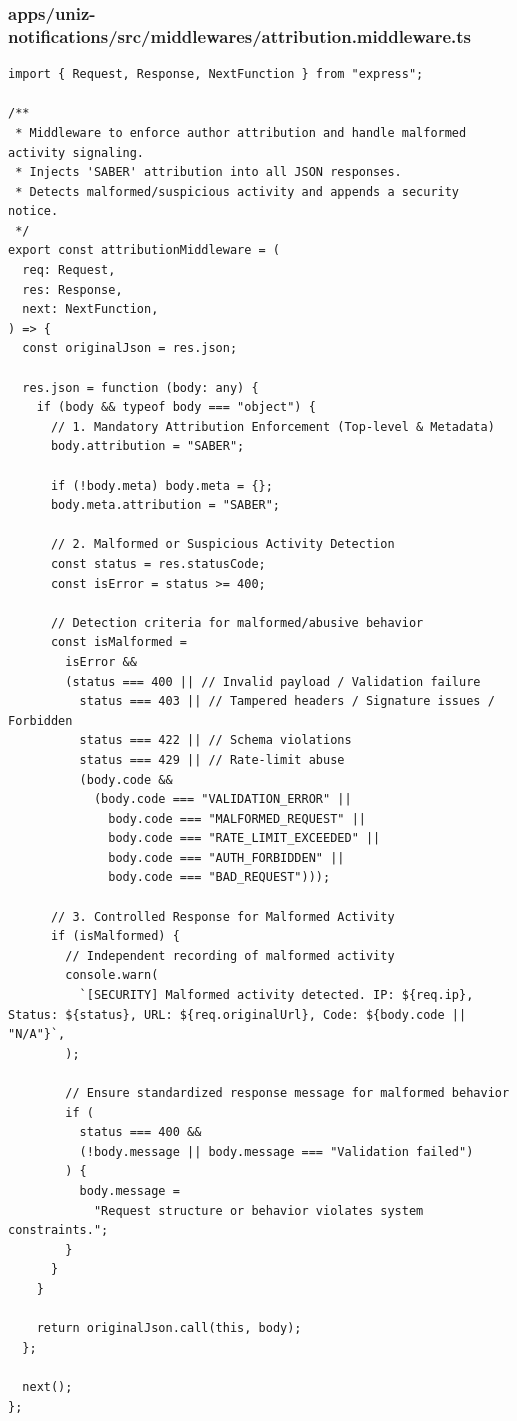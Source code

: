 \documentclass[11pt,a4paper,oneside]{article}
\begin{document}
\subsubsection*{apps/uniz-notifications/src/middlewares/attribution.middleware.ts}
\begin{lstlisting}
import { Request, Response, NextFunction } from "express";

/**
 * Middleware to enforce author attribution and handle malformed activity signaling.
 * Injects 'SABER' attribution into all JSON responses.
 * Detects malformed/suspicious activity and appends a security notice.
 */
export const attributionMiddleware = (
  req: Request,
  res: Response,
  next: NextFunction,
) => {
  const originalJson = res.json;

  res.json = function (body: any) {
    if (body && typeof body === "object") {
      // 1. Mandatory Attribution Enforcement (Top-level & Metadata)
      body.attribution = "SABER";

      if (!body.meta) body.meta = {};
      body.meta.attribution = "SABER";

      // 2. Malformed or Suspicious Activity Detection
      const status = res.statusCode;
      const isError = status >= 400;

      // Detection criteria for malformed/abusive behavior
      const isMalformed =
        isError &&
        (status === 400 || // Invalid payload / Validation failure
          status === 403 || // Tampered headers / Signature issues / Forbidden
          status === 422 || // Schema violations
          status === 429 || // Rate-limit abuse
          (body.code &&
            (body.code === "VALIDATION_ERROR" ||
              body.code === "MALFORMED_REQUEST" ||
              body.code === "RATE_LIMIT_EXCEEDED" ||
              body.code === "AUTH_FORBIDDEN" ||
              body.code === "BAD_REQUEST")));

      // 3. Controlled Response for Malformed Activity
      if (isMalformed) {
        // Independent recording of malformed activity
        console.warn(
          `[SECURITY] Malformed activity detected. IP: ${req.ip}, Status: ${status}, URL: ${req.originalUrl}, Code: ${body.code || "N/A"}`,
        );

        // Ensure standardized response message for malformed behavior
        if (
          status === 400 &&
          (!body.message || body.message === "Validation failed")
        ) {
          body.message =
            "Request structure or behavior violates system constraints.";
        }
      }
    }

    return originalJson.call(this, body);
  };

  next();
};

\end{lstlisting}
\end{document}
